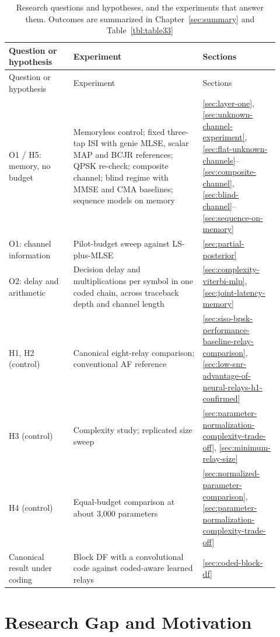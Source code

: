 \begin{longtable}[]{@{}>{\raggedright\arraybackslash}p{0.22\linewidth}>{\raggedright\arraybackslash}p{0.44\linewidth}>{\raggedright\arraybackslash}p{0.26\linewidth}@{}}
\caption[Research questions and the experiments that answer them]{Research questions and hypotheses, and the experiments that answer them. Outcomes are summarized in Chapter~\ref{sec:summary} and Table~\ref{tbl:table33}}\label{tbl:rq-map}\tabularnewline
\toprule\noalign{}
Question or hypothesis & Experiment & Sections \\
\midrule\noalign{}
\endfirsthead
\toprule\noalign{}
Question or hypothesis & Experiment & Sections \\
\midrule\noalign{}
\endhead
\bottomrule\noalign{}
\endlastfoot
O1 / H5: memory, no budget & Memoryless control; fixed three-tap ISI with genie MLSE, scalar MAP and BCJR references; QPSK re-check; composite channel; blind regime with MMSE and CMA baselines; sequence models on memory & \ref{sec:layer-one}, \ref{sec:unknown-channel-experiment}, \ref{sec:flat-unknown-channels}--\ref{sec:composite-channel}, \ref{sec:blind-channel}--\ref{sec:sequence-on-memory} \\
O1: channel information & Pilot-budget sweep against LS-plus-MLSE & \ref{sec:partial-posterior} \\
O2: delay and arithmetic & Decision delay and multiplications per symbol in one coded chain, across traceback depth and channel length & \ref{sec:complexity-viterbi-mlp}, \ref{sec:joint-latency-memory} \\
H1, H2 (control) & Canonical eight-relay comparison; conventional AF reference & \ref{sec:siso-bpsk-performance-baseline-relay-comparison}, \ref{sec:low-snr-advantage-of-neural-relays-h1-confirmed} \\
H3 (control) & Complexity study; replicated size sweep & \ref{sec:parameter-normalization-complexity-trade-off}, \ref{sec:minimum-relay-size} \\
H4 (control) & Equal-budget comparison at about 3{,}000 parameters & \ref{sec:normalized-parameter-comparison}, \ref{sec:parameter-normalization-complexity-trade-off} \\
Canonical result under coding & Block DF with a convolutional code against coded-aware learned relays & \ref{sec:coded-block-df} \\
\end{longtable}

\section{Research Gap and Motivation}\label{sec:research-gap-and-motivation}

